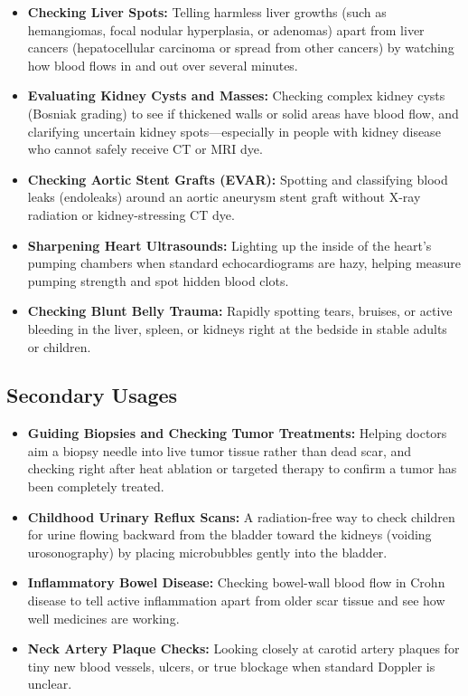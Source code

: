 \begin{itemize}
    \item \textbf{Checking Liver Spots:} Telling harmless liver growths (such as hemangiomas, focal nodular hyperplasia, or adenomas) apart from liver cancers (hepatocellular carcinoma or spread from other cancers) by watching how blood flows in and out over several minutes.
    \item \textbf{Evaluating Kidney Cysts and Masses:} Checking complex kidney cysts (Bosniak grading) to see if thickened walls or solid areas have blood flow, and clarifying uncertain kidney spots---especially in people with kidney disease who cannot safely receive CT or MRI dye.
    \item \textbf{Checking Aortic Stent Grafts (EVAR):} Spotting and classifying blood leaks (endoleaks) around an aortic aneurysm stent graft without X-ray radiation or kidney-stressing CT dye.
    \item \textbf{Sharpening Heart Ultrasounds:} Lighting up the inside of the heart's pumping chambers when standard echocardiograms are hazy, helping measure pumping strength and spot hidden blood clots.
    \item \textbf{Checking Blunt Belly Trauma:} Rapidly spotting tears, bruises, or active bleeding in the liver, spleen, or kidneys right at the bedside in stable adults or children.
\end{itemize}

\subsection{Secondary Usages}

\begin{itemize}
    \item \textbf{Guiding Biopsies and Checking Tumor Treatments:} Helping doctors aim a biopsy needle into live tumor tissue rather than dead scar, and checking right after heat ablation or targeted therapy to confirm a tumor has been completely treated.
    \item \textbf{Childhood Urinary Reflux Scans:} A radiation-free way to check children for urine flowing backward from the bladder toward the kidneys (voiding urosonography) by placing microbubbles gently into the bladder.
    \item \textbf{Inflammatory Bowel Disease:} Checking bowel-wall blood flow in Crohn disease to tell active inflammation apart from older scar tissue and see how well medicines are working.
    \item \textbf{Neck Artery Plaque Checks:} Looking closely at carotid artery plaques for tiny new blood vessels, ulcers, or true blockage when standard Doppler is unclear.
\end{itemize}


